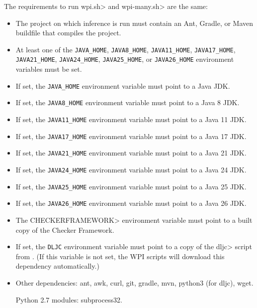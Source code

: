 
The requirements to run \<wpi.sh> and \<wpi-many.sh> are the same:

\begin{itemize}
\item The project on which inference is run must contain an Ant, Gradle,
  or Maven buildfile that compiles the project.
\item At least one of the \verb|JAVA_HOME|, \verb|JAVA8_HOME|,
  \verb|JAVA11_HOME|, \verb|JAVA17_HOME|, \verb|JAVA21_HOME|,
  \verb|JAVA24_HOME|, \verb|JAVA25_HOME|, or \verb|JAVA26_HOME|
  environment variables must be set.
\item If set, the \verb|JAVA_HOME| environment variable must point to a
  Java JDK.
\item If set, the \verb|JAVA8_HOME| environment variable must point to a Java 8 JDK.
\item If set, the \verb|JAVA11_HOME| environment variable must point to a Java 11 JDK.
\item If set, the \verb|JAVA17_HOME| environment variable must point to a Java 17 JDK.
\item If set, the \verb|JAVA21_HOME| environment variable must point to a Java 21 JDK.
\item If set, the \verb|JAVA24_HOME| environment variable must point to a Java 24 JDK.
\item If set, the \verb|JAVA25_HOME| environment variable must point to a Java 25 JDK.
\item If set, the \verb|JAVA26_HOME| environment variable must point to a Java 26 JDK.
\item The \<CHECKERFRAMEWORK> environment variable must point to a built copy of the Checker Framework.
\item If set, the \verb|DLJC| environment variable must point to a copy of the \<dljc> script
from . (If this variable is not
set, the WPI scripts will download this dependency automatically.)
\item Other dependencies:
  ant,
  awk,
  curl,
  git,
  gradle,
  mvn,
  python3 (for dljc),
  wget.

  Python 2.7 modules:
  subprocess32.
\end{itemize}




